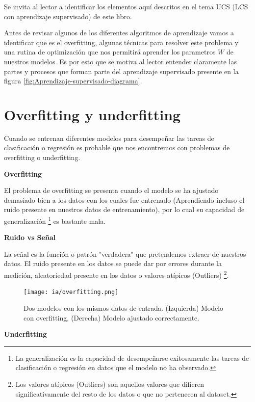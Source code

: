 \documentclass[11pt,fleqn]{book} %
\begin{document}
Se invita al lector a identificar los elementos aquí descritos en el tema UCS (LCS con aprendizaje supervisado) de este libro.

Antes de revisar algunos de los diferentes algoritmos de aprendizaje vamos a identificar que es el overfitting, algunas técnicas para resolver este problema y una rutina de optimización que nos permitirá aprender los parametros $W$ de nuestros modelos. Es por esto que se motiva al lector entender claramente las partes y procesos que forman parte del aprendizaje supervisado presente en la figura \ref{fig:Aprendizaje-supervisado-diagrama}.

\clearpage

\section{Overfitting y underfitting} 

Cuando se entrenan diferentes modelos para desempeñar las tareas de clasificación o regresión es probable que nos encontremos con problemas de overfitting o underfitting.

\textbf{Overfitting}

El problema de overfitting se presenta cuando el modelo se ha ajustado demasiado bien a los datos con los cuales fue entrenado (Aprendiendo incluso el ruido presente en nuestros datos de entrenamiento), por lo cual su capacidad de generalización \footnote{ La generalización es la capacidad de desempeñarse exitosamente las tareas de clasificación o regresión en datos que el modelo no ha observado. } es bastante mala.

\textbf{Ruido vs Señal}

La señal es la función o patrón "verdadera" que pretendemos extraer de nuestros datos. El ruido presente en los datos se puede dar por errores durante la medición, aleatoriedad presente en los datos o valores atípicos (Outliers) \footnote{ Los valores atípicos (Outliers) son aquellos valores que difieren significativamente del resto de los datos o que no pertenecen al dataset. }.


\begin{figure}[ht]
\centering\texttt{[image: ia/overfitting.png]}
\caption{Dos modelos con los mismos datos de entrada. (Izquierda) Modelo con overfitting, (Derecha) Modelo ajustado correctamente.}

\label{fig:overfitting} 
\end{figure}

\textbf{Underfitting}
\end{document}
